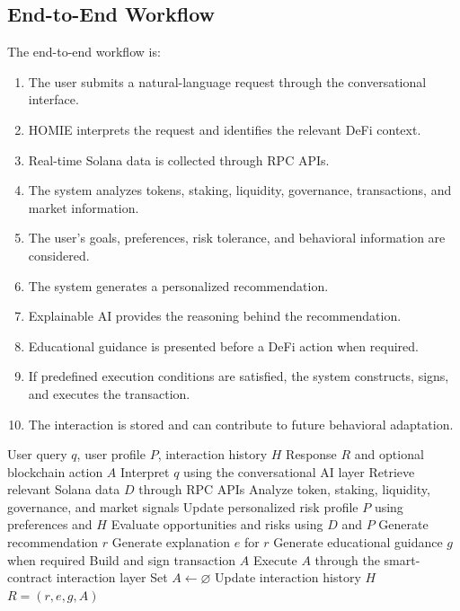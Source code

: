\documentclass[conference]{IEEEtran}
\begin{document}
\subsection{End-to-End Workflow}

The end-to-end workflow is:
\begin{enumerate}
    \item The user submits a natural-language request through the conversational interface.
    \item HOMIE interprets the request and identifies the relevant DeFi context.
    \item Real-time Solana data is collected through RPC APIs.
    \item The system analyzes tokens, staking, liquidity, governance, transactions, and market information.
    \item The user's goals, preferences, risk tolerance, and behavioral information are considered.
    \item The system generates a personalized recommendation.
    \item Explainable AI provides the reasoning behind the recommendation.
    \item Educational guidance is presented before a DeFi action when required.
    \item If predefined execution conditions are satisfied, the system constructs, signs, and executes the transaction.
    \item The interaction is stored and can contribute to future behavioral adaptation.
\end{enumerate}

\begin{algorithm}[t]
\caption{HOMIE Conversational DeFi Decision Workflow}
\label{alg:homie}
\begin{algorithmic}[1]
\Require User query $q$, user profile $P$, interaction history $H$
\Ensure Response $R$ and optional blockchain action $A$
\State Interpret $q$ using the conversational AI layer
\State Retrieve relevant Solana data $D$ through RPC APIs
\State Analyze token, staking, liquidity, governance, and market signals
\State Update personalized risk profile $P$ using preferences and $H$
\State Evaluate opportunities and risks using $D$ and $P$
\State Generate recommendation $r$
\State Generate explanation $e$ for $r$
\State Generate educational guidance $g$ when required
    \State Build and sign transaction $A$
    \State Execute $A$ through the smart-contract interaction layer
\Else
    \State Set $A \gets \varnothing$
\EndIf
\State Update interaction history $H$
\State \Return $R=(r,e,g,A)$
\end{algorithmic}
\end{algorithm}
\end{document}
